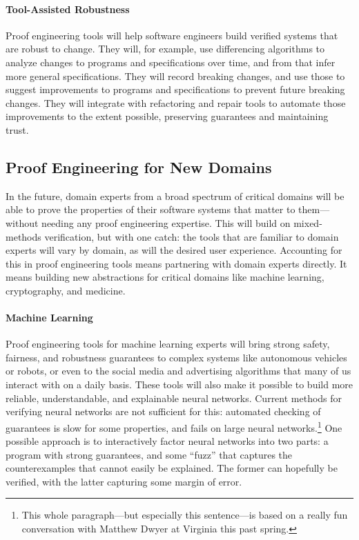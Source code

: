 \paragraph{Tool-Assisted Robustness}
Proof engineering tools will help software engineers build verified systems that are robust to change.
They will, for example, use differencing algorithms to analyze changes to programs and specifications over time,
and from that infer more general specifications.
They will record breaking changes, and use those to suggest improvements to programs and specifications to prevent future breaking changes.
They will integrate with refactoring and repair tools to automate those improvements to the extent possible,
preserving guarantees and maintaining trust.

\subsection*{Proof Engineering for New Domains}

In the future, domain experts from a broad spectrum of critical domains will be able to prove the properties
of their software systems that matter to them---without needing any proof engineering expertise.
This will build on mixed-methods verification, but with one catch:
the tools that are familiar to domain experts will vary by domain, as will the desired user experience.
Accounting for this in proof engineering tools means partnering with domain experts directly.
It means building new abstractions for critical domains like machine learning, cryptography, and medicine.


\paragraph{Machine Learning}
Proof engineering tools for machine learning experts will bring strong safety, fairness, and robustness guarantees to
complex systems like autonomous vehicles or robots, or even to the social media and advertising algorithms that many of us interact with
on a daily basis. These tools will also make it possible to build more reliable, understandable, and explainable neural networks.
Current methods for verifying neural networks are not sufficient for this: 
automated checking of guarantees is slow for some properties, and fails on large 
neural networks.\footnote{This whole paragraph---but especially this sentence---is based on a really fun conversation with Matthew Dwyer at Virginia this past spring.}
One possible approach is to interactively factor neural networks into two parts: a program with strong guarantees,
and some ``fuzz'' that captures the counterexamples that cannot easily be explained.
The former can hopefully be verified, with the latter capturing some margin of error.

